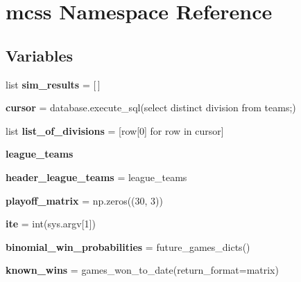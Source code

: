 \hypertarget{namespacemcss}{}\section{mcss Namespace Reference}
\label{namespacemcss}
\subsection*{Variables}
\begin{DoxyCompactItemize}
\item 
list {\bfseries sim\+\_\+results} = \mbox{[}$\,$\mbox{]}\hypertarget{namespacemcss_a118e64826a48fb7dbe8e94f0d41b048e}{}\label{namespacemcss_a118e64826a48fb7dbe8e94f0d41b048e}

\item 
{\bfseries cursor} = database.\+execute\+\_\+sql(\textquotesingle{}select distinct division from teams;\textquotesingle{})\hypertarget{namespacemcss_afbb1f99c5bc09facf42dc6aab22b3ddc}{}\label{namespacemcss_afbb1f99c5bc09facf42dc6aab22b3ddc}

\item 
list {\bfseries list\+\_\+of\+\_\+divisions} = \mbox{[}row\mbox{[}0\mbox{]} for row in cursor\mbox{]}\hypertarget{namespacemcss_a38274d2c6587000deba8dfe2dcfedb99}{}\label{namespacemcss_a38274d2c6587000deba8dfe2dcfedb99}

\item 
{\bfseries league\+\_\+teams}
\item 
{\bfseries header\+\_\+league\+\_\+teams} = league\+\_\+teams\hypertarget{namespacemcss_a78db834a61f7f593b2f1ade3a1414717}{}\label{namespacemcss_a78db834a61f7f593b2f1ade3a1414717}

\item 
{\bfseries playoff\+\_\+matrix} = np.\+zeros((30, 3))\hypertarget{namespacemcss_abbc0ebe4969dd30954248b8518a97bfa}{}\label{namespacemcss_abbc0ebe4969dd30954248b8518a97bfa}

\item 
{\bfseries ite} = int(sys.\+argv\mbox{[}1\mbox{]})\hypertarget{namespacemcss_a3cdb91c921b943b593cd0ef3bd31fc6d}{}\label{namespacemcss_a3cdb91c921b943b593cd0ef3bd31fc6d}

\item 
{\bfseries binomial\+\_\+win\+\_\+probabilities} = future\+\_\+games\+\_\+dicts()\hypertarget{namespacemcss_a2b2ad601f6c6f3ca19e25090e86d9208}{}\label{namespacemcss_a2b2ad601f6c6f3ca19e25090e86d9208}

\item 
{\bfseries known\+\_\+wins} = games\+\_\+won\+\_\+to\+\_\+date(return\+\_\+format=\textquotesingle{}matrix\textquotesingle{})\hypertarget{namespacemcss_a0b38d6d89c7bb5f44c3b9088902fded4}{}\label{namespacemcss_a0b38d6d89c7bb5f44c3b9088902fded4}


\end{DoxyCompactItemize}
